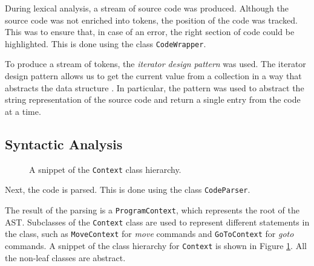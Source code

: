 During lexical analysis, a stream of source code was produced. Although the source code was not enriched into tokens, the position of the code was tracked. This was to ensure that, in case of an error, the right section of code could be highlighted. This is done using the class \texttt{CodeWrapper}. 

To produce a stream of tokens, the \emph{iterator design pattern} was used. The iterator design pattern allows us to get the current value from a collection in a way that abstracts the data structure \citep{gamma1995design}. In particular, the pattern was used to abstract the string representation of the source code and return a single entry from the code at a time. 

\subsection{Syntactic Analysis}
\begin{figure}[htb]
    \centering
    \caption{A snippet of the \texttt{Context} class hierarchy.}
    \label{fig:context_hierarchy}
\end{figure}

Next, the code is parsed. This is done using the class \texttt{CodeParser}. 

The result of the parsing is a \texttt{ProgramContext}, which represents the root of the AST. Subclasses of the \texttt{Context} class are used to represent different statements in the class, such as \texttt{MoveContext} for \textit{move} commands and \texttt{GoToContext} for \textit{goto} commands. A snippet of the class hierarchy for \texttt{Context} is shown in Figure \ref{fig:context_hierarchy}. All the non-leaf classes are abstract.

